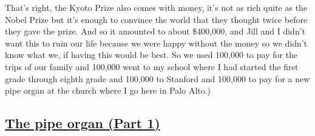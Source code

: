 \documentclass[]{article}
\begin{document}
That's right, the Kyoto Prize also comes with money, it's not as rich
quite as the Nobel Prize but it's enough to convince the world that they
thought twice before they gave the prize. And so it amounted to about
\$400,000, and Jill and I didn't want this to ruin our life because we
were happy without the money so we didn't know what we, if having this
would be best. So we used 100,000 to pay for the trips of our family and
100,000 went to my school where I had started the first grade through
eighth grade and 100,000 to Stanford and 100,000 to pay for a new pipe
organ at the church where I go here in Palo Alto.)

\subsection{\texorpdfstring{\href{http://webofstories.com/play/17147}{The
pipe organ (Part
1)}}{The pipe organ (Part 1)}}\label{the-pipe-organ-part-1}
\end{document}
